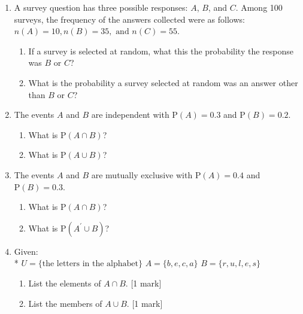 \documentclass[12pt, twoside]{article}
\begin{document}
\begin{enumerate}
\subsubsection*{1.20 PreExam: Probability, Venn diagrams}

\item A survey question has three possible responses: $A$, $B$, and $C$. Among 100 surveys, the frequency of the answers collected were as follows: $n(A)=10, n(B)=35, \text{ and } n(C)=55$.
    \begin{enumerate}
        \item If a survey is selected at random, what this the probability the response was $B$ or $C$?  \vspace{1cm}
        \item What is the probability a survey selected at random was an answer other than $B$ or $C$?  \vspace{1cm}
    \end{enumerate}

\item The events $A$ and $B$ are independent with $\mathrm P(A)=0.3$ and $\mathrm P(B)=0.2$.
    \begin{enumerate}
        \item What is $\mathrm P(A \cap B)$? \vspace{1cm}
        \item What is $\mathrm P(A \cup B)$? \vspace{1cm}
    \end{enumerate}

\item The events $A$ and $B$ are mutually exclusive with $\mathrm P(A)=0.4$ and $\mathrm P(B)=0.3$.
    \begin{enumerate}
        \item What is $\mathrm P(A \cap B)$? \vspace{1cm}
        \item What is $\mathrm P(A^\prime \cup B)$? \vspace{1cm}
    \end{enumerate}

\item Given: \\*
    $U = \{\text{the letters in the alphabet}\}$ \qquad
    $A = \{b, e, c, a\}$ \qquad
    $B = \{r, u, l, e, s\}$
    \begin{enumerate}[itemsep=0.7cm]
        \item List the elements of $A \cap B$. \hfill [1 mark]
        \item List the members of $A \cup B$. \hfill [1 mark]
    \end{enumerate} \vspace{0.7cm}


\end{enumerate}
\end{document}
